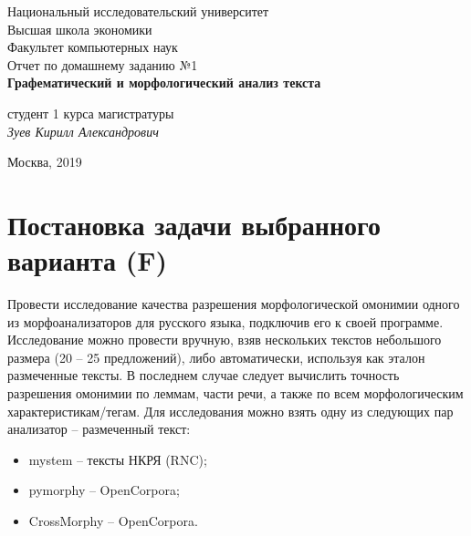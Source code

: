 \documentclass[oneside,final,12pt]{article}
\begin{document}
\begin{titlepage}
\begin{center}

    Национальный исследовательский университет\\
    Высшая школа экономики\\
    Факультет компьютерных наук\\[60mm]
    \bigskip
    Отчет по домашнему заданию №1 \\[5mm]   
    \textsf{\large\bfseries
        Графематический и морфологический анализ текста
    }\\[50mm]

   
    \begin{flushright}
        \parbox{0.4\textwidth}{
            студент 1 курса магистратуры\\
            \emph{Зуев Кирилл Александрович}\\[5mm]
        }
    \end{flushright}

    \vspace{\fill}
    Москва, 2019
\end{center}
\end{titlepage}

\newpage

\renewcommand{\contentsname}{Содержание}
\tableofcontents

\newpage

\section{Постановка задачи выбранного варианта (F)}

Провести исследование качества разрешения морфологической омонимии одного из 	морфоанализаторов для русского языка, подключив его к своей  программе.
Исследование можно провести вручную, взяв нескольких текстов небольшого размера (20 -- 25 предложений), либо автоматически, используя как эталон размеченные тексты. В последнем случае следует вычислить точность разрешения омонимии по леммам, части речи, а также по всем морфологическим характеристикам/тегам. Для исследования можно взять одну из следующих пар анализатор – размеченный текст:

\begin{itemize}
	\item mystem – тексты НКРЯ (RNC);
	\item pymorphy – OpenCorpora;
	\item CrossMorphy – OpenCorpora.
\end{itemize}
\end{document}

